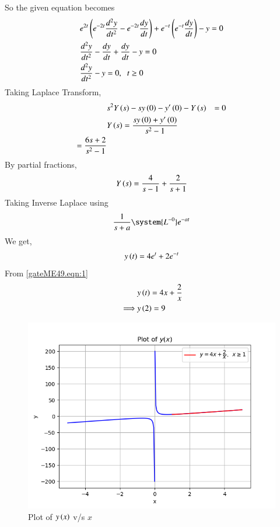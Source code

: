 \documentclass[journal,12pt,twocolumn]{IEEEtran}
\theoremstyle{remark}
\begin{document}
So the given equation becomes
\begin{align}
    &e^{2t}\left(e^{-2t}\frac{d^2y}{dt^2}-e^{-2t}\frac{dy}{dt}\right) + e^{-t}\left(e^{-t}\frac{dy}{dt}\right) -y=0\\
    &\frac{d^2y}{dt^2}-\frac{dy}{dt}+\frac{dy}{dt}-y=0\\
    &\frac{d^2y}{dt^2} - y=0,\;\;t\geq 0
\end{align}
Taking Laplace Transform, 
\begin{align}
    &s^2Y\left(s\right)-sy\left(0\right)-y'\left(0\right)-Y\left(s\right)&=0\\
    &Y\left(s\right)=\frac{sy\left(0\right)+y'\left(0\right)}{s^2-1}\\
    =\frac{6s+2}{s^2-1}
\end{align}
By partial fractions,
\begin{align}
    Y\left(s\right)=\frac{4}{s-1}+\frac{2}{s+1}
\end{align}
Taking Inverse Laplace using 
\begin{align}
    \frac{1}{s+a} \system{L^{-0}} e^{-at}
\end{align}
We get,
\begin{align}
    y\left(t\right)=4e^{t}+2e^{-t}
\end{align}
From \eqref{gateME49.eqn:1}
\begin{align}
    &y\left(t\right)=4x+\frac{2}{x}\\
    \implies &y\left(2\right)=9
\end{align}
\begin{figure}[h]
    \centering
    \includegraphics[width=\columnwidth]{figs/fig.png}
    \caption{Plot of $y\left(x\right)$ v/s $x$}
\end{figure}
\end{document}
